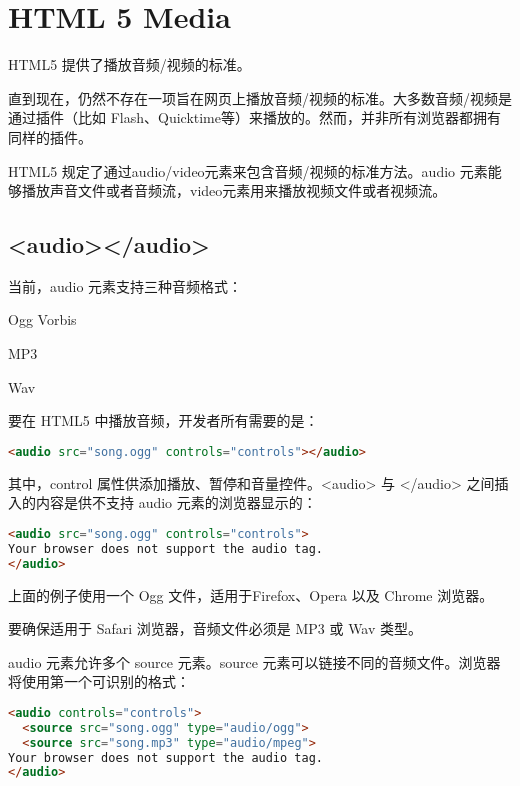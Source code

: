 \section{HTML 5 Media}


HTML5 提供了播放音频/视频的标准。

直到现在，仍然不存在一项旨在网页上播放音频/视频的标准。大多数音频/视频是通过插件（比如 Flash、Quicktime等）来播放的。然而，并非所有浏览器都拥有同样的插件。

HTML5 规定了通过audio/video元素来包含音频/视频的标准方法。audio 元素能够播放声音文件或者音频流，video元素用来播放视频文件或者视频流。



\subsection{<audio></audio>}

当前，audio 元素支持三种音频格式：

\begin{compactitem}
\item Ogg Vorbis
\item MP3
\item Wav
\end{compactitem}

要在 HTML5 中播放音频，开发者所有需要的是：

\begin{lstlisting}[language=HTML]
<audio src="song.ogg" controls="controls"></audio>
\end{lstlisting}

其中，control 属性供添加播放、暂停和音量控件。<audio> 与 </audio> 之间插入的内容是供不支持 audio 元素的浏览器显示的：

\begin{lstlisting}[language=HTML]
<audio src="song.ogg" controls="controls">
Your browser does not support the audio tag.
</audio>
\end{lstlisting}

上面的例子使用一个 Ogg 文件，适用于Firefox、Opera 以及 Chrome 浏览器。

要确保适用于 Safari 浏览器，音频文件必须是 MP3 或 Wav 类型。

audio 元素允许多个 source 元素。source 元素可以链接不同的音频文件。浏览器将使用第一个可识别的格式：



\begin{lstlisting}[language=HTML]
<audio controls="controls">
  <source src="song.ogg" type="audio/ogg">
  <source src="song.mp3" type="audio/mpeg">
Your browser does not support the audio tag.
</audio>
\end{lstlisting}


